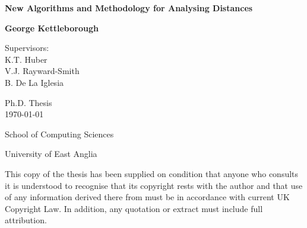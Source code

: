 \documentclass[a4paper,11pt,oneside]{book}
\title{\reporttitle}
\author{\reportauthor}
\newcommand{\reporttitle}{New Algorithms and Methodology for Analysing
  Distances}
\newcommand{\reportauthor}{George Kettleborough}
\newcommand{\0}{{\emptyset}}
\begin{document}

\begin{titlepage}
\begin{center}
\vspace*{0.4in}
{\Huge\bfseries\sffamily \reporttitle\par}
\vspace{.7in}
{\large\bfseries\sffamily \reportauthor\par}
\par
\vspace{.3in}
{ Supervisors:\\
K.T. Huber\\
V.J. Rayward-Smith\\
B. De La Iglesia}
\par
\vspace{0.5in}
Ph.D. Thesis\\
\monthyeardate\today
\par
\vspace{0.5in}
School of Computing Sciences
\par
\vspace{0.5in}
University of East Anglia
\par
\vspace{0.3in}
\par
\vspace{0.3in}
{\small This copy of the thesis has been supplied on condition
  that anyone who consults it is understood to recognise that its copyright
  rests with the author and that use of any information derived there from
  must be in accordance with current UK Copyright Law. In addition, any
  quotation or extract must include full attribution.}
\end{center}
\end{titlepage}


\newpage

\setcounter{page}{2}



\newpage

\tableofcontents
\newpage

\listoffigures
\newpage

\listofalgorithms
{}
\newpage

\listoftables
\newpage

\setcounter{page}{1}
\end{document}
